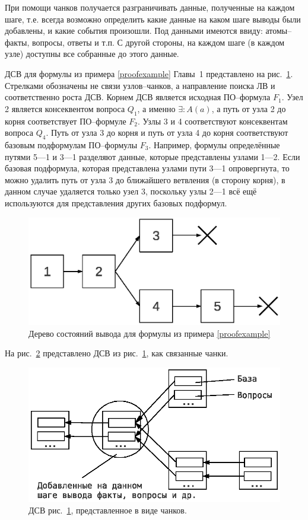 При помощи чанков получается разграничивать данные, полученные на каждом шаге, т.е. всегда возможно определить какие данные на каком шаге выводы были добавлены, и какие события произошли. Под данными имеются ввиду: атомы--факты, вопросы, ответы и т.п. С другой стороны, на каждом шаге (в каждом узле) доступны все собранные до этого данные.

ДСВ для формулы из примера \ref{proofexample} Главы~1 представлено на рис.~\ref{fig:pst}. Стрелками обозначены не связи узлов--чанков, а направление поиска ЛВ и соответственно роста ДСВ. Корнем ДСВ является исходная ПО--формула $F_1$. Узел 2 является консеквентом вопроса $Q_1$, а именно $\exists\colon A(a)$, а путь от узла 2 до корня соответствует ПО--формуле $F_2$. Узлы 3 и 4 соответствуют консеквентам вопроса $Q_4$. Путь от узла 3 до корня и путь от узла 4 до корня соответствуют базовым подформулам ПО--формулы $F_3$. Например, формулы определённые путями 5---1 и 3---1 разделяют данные, которые представлены узлами 1---2. Если базовая подформула, которая представлена узлами пути 3---1 опровергнута, то можно удалить путь от узла 3 до ближайшего ветвления (в сторону корня), в данном случае удаляется только узел 3, поскольку узлы 2---1 всё ещё используются для представления других базовых подформул.
\begin{figure}[h]
	\centering
	\includegraphics[width=0.4\linewidth]{pics/PST.eps}
	\caption{Дерево состояний вывода для формулы из примера \ref{proofexample}}
	\label{fig:pst}
\end{figure}
На рис.~\ref{fig:pst2} представлено ДСВ из рис.~\ref{fig:pst}, как связанные чанки.
\begin{figure}[h]
	\centering
	\includegraphics[width=0.6\linewidth]{pics/PST2.eps}
	\caption{ДСВ рис.~\ref{fig:pst}, представленное в виде чанков.}
	\label{fig:pst2}
\end{figure}

